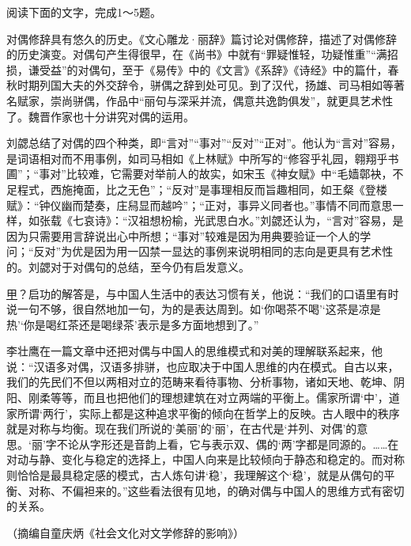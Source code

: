 \documentclass[11pt,a4paper]{ctexart}
\begin{document}


阅读下面的文字，完成1～5题。

\begin{materialtext}
对偶修辞具有悠久的历史。《文心雕龙·丽辞》篇讨论对偶修辞，描述了对偶修辞的历史演变。对偶句产生得很早，在《尚书》中就有“罪疑惟轻，功疑惟重”“满招损，谦受益”的对偶句，至于《易传》中的《文言》《系辞》《诗经》中的篇什，春秋时期列国大夫的外交辞令，骈偶之辞到处可见。到了汉代，扬雄、司马相如等著名赋家，崇尚骈偶，作品中“丽句与深采并流，偶意共逸韵俱发”，就更具艺术性了。魏晋作家也十分讲究对偶的运用。

刘勰总结了对偶的四个种类，即“言对”“事对”“反对”“正对”。他认为“言对”容易，是词语相对而不用事例，如司马相如《上林赋》中所写的“修容乎礼园，翱翔乎书圃”；“事对”比较难，它需要对举前人的故实，如宋玉《神女赋》中“毛嫱鄣袂，不足程式，西施掩面，比之无色”；“反对”是事理相反而旨趣相同，如王粲《登楼赋》：“钟仪幽而楚奏，庄舄显而越吟”；“正对，事异义同者也。”事情不同而意思一样，如张载《七哀诗》：“汉祖想枌榆，光武思白水。”刘勰还认为，“言对”容易，是因为只需要用言辞说出心中所想；“事对”较难是因为用典要验证一个人的学问；“反对”为优是因为用一囚禁一显达的事例来说明相同的志向是更具有艺术性的。刘勰对于对偶句的总结，至今仍有启发意义。

\uline{\hspace{0.6em}甲\hspace{0.6em}}？启功的解答是，与中国人生活中的表达习惯有关，他说：“我们的口语里有时说一句不够，很自然地加一句，为的是表达周到。如‘你喝茶不喝’‘这茶是凉是热’‘你是喝红茶还是喝绿茶’表示是多方面地想到了。”

李壮鹰在一篇文章中还把对偶与中国人的思维模式和对美的理解联系起来，他说：“汉语多对偶，汉语多排骈，也应取决于中国人思维的内在模式。自古以来，我们的先民们不但以两相对立的范畴来看待事物、分析事物，诸如天地、乾坤、阴阳、刚柔等等，而且也把他们的理想建筑在对立两端的平衡上。儒家所谓‘中’，道家所谓‘两行’，实际上都是这种追求平衡的倾向在哲学上的反映。古人眼中的秩序就是对称与均衡。现在我们所说的‘美丽’的‘丽’，在古代是‘并列、对偶’的意思。‘丽’字不论从字形还是音韵上看，它与表示双、偶的‘两’字都是同源的。……在对动与静、变化与稳定的选择上，中国人向来是比较倾向于静态和稳定的。而对称则恰恰是最具稳定感的模式，古人炼句讲‘稳’，我理解这个‘稳’，就是从偶句的平衡、对称、不偏袒来的。”这些看法很有见地，的确对偶与中国人的思维方式有密切的关系。
\end{materialtext}
\begin{flushright}（摘编自童庆炳《社会文化对文学修辞的影响》）\end{flushright}
\end{document}
